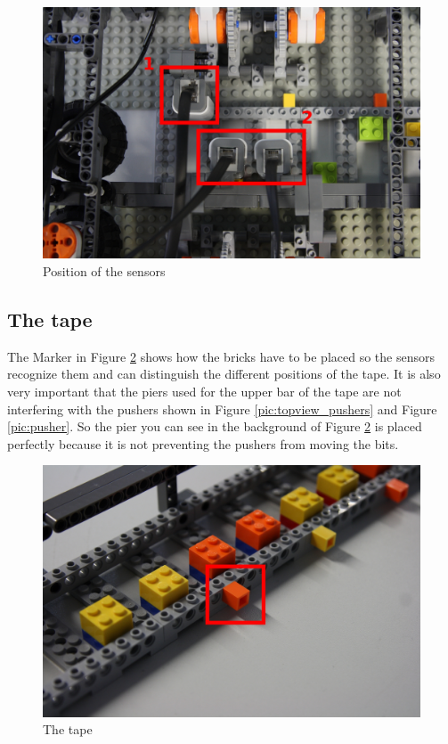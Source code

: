 \documentclass[%
  a4paper,%
  11pt,%
  blue,%
  hyperref	%
  ]{tubsartcl}
\begin{document}
\begin{figure}[!htb]
\begin{center}
\includegraphics[scale=0.3]{graphics_lego/sensors.jpg}
\end{center}
\caption{Position of the sensors}
\label{pic:sensors}
\end{figure}

\newpage

\subsection{The tape}

The Marker in Figure \ref{pic:tape} shows how the bricks have to be placed so the sensors recognize them and can distinguish the different positions of the tape. It is also very important that the piers used for the upper bar of the tape are not interfering with the pushers shown in Figure \ref{pic:topview_pushers} and Figure \ref{pic:pusher}. So the pier you can see in the background of Figure \ref{pic:tape} is placed perfectly because it is not preventing the pushers from moving the bits.

\begin{figure}[!htb]
\begin{center}
\includegraphics[scale=0.3]{graphics_lego/tape.jpg}
\end{center}
\caption{The tape}
\label{pic:tape}
\end{figure}
\end{document}
